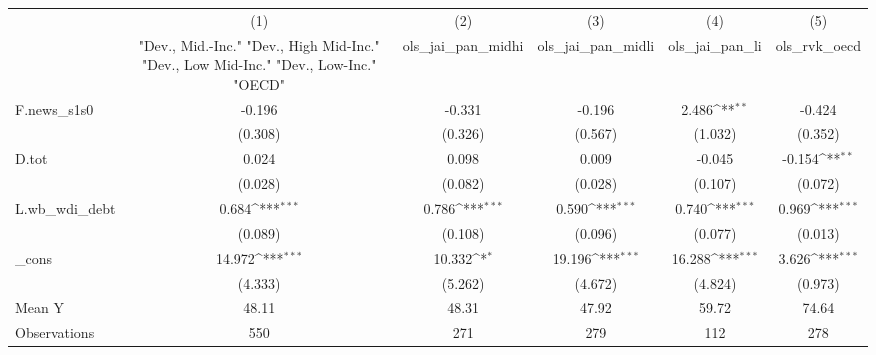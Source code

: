 {
\def\sym#1{\ifmmode^{#1}\else\(^{#1}\)\fi}
\begin{tabular}{l*{5}{c}}
\toprule
            &\multicolumn{1}{c}{(1)}&\multicolumn{1}{c}{(2)}&\multicolumn{1}{c}{(3)}&\multicolumn{1}{c}{(4)}&\multicolumn{1}{c}{(5)}\\
            &\multicolumn{1}{c}{ "Dev., Mid.-Inc." "Dev., High Mid-Inc." "Dev., Low Mid-Inc." "Dev., Low-Inc." "OECD" }&\multicolumn{1}{c}{ols\_jai\_pan\_midhi}&\multicolumn{1}{c}{ols\_jai\_pan\_midli}&\multicolumn{1}{c}{ols\_jai\_pan\_li}&\multicolumn{1}{c}{ols\_rvk\_oecd}\\
\midrule
F.news\_s1s0 &      -0.196         &      -0.331         &      -0.196         &       2.486\sym{**} &      -0.424         \\
            &     (0.308)         &     (0.326)         &     (0.567)         &     (1.032)         &     (0.352)         \\
\addlinespace
D.tot       &       0.024         &       0.098         &       0.009         &      -0.045         &      -0.154\sym{**} \\
            &     (0.028)         &     (0.082)         &     (0.028)         &     (0.107)         &     (0.072)         \\
\addlinespace
L.wb\_wdi\_debt&       0.684\sym{***}&       0.786\sym{***}&       0.590\sym{***}&       0.740\sym{***}&       0.969\sym{***}\\
            &     (0.089)         &     (0.108)         &     (0.096)         &     (0.077)         &     (0.013)         \\
\addlinespace
\_cons      &      14.972\sym{***}&      10.332\sym{*}  &      19.196\sym{***}&      16.288\sym{***}&       3.626\sym{***}\\
            &     (4.333)         &     (5.262)         &     (4.672)         &     (4.824)         &     (0.973)         \\
\midrule
Mean Y      &       48.11         &       48.31         &       47.92         &       59.72         &       74.64         \\
Observations&         550         &         271         &         279         &         112         &         278         \\
\bottomrule
\end{tabular}
}
